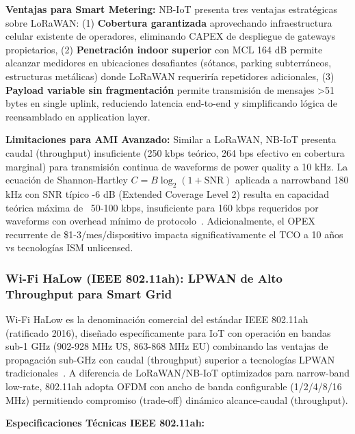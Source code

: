 \textbf{Ventajas para Smart Metering:} NB-IoT presenta tres ventajas estratégicas sobre LoRaWAN: (1) \textbf{Cobertura garantizada} aprovechando infraestructura celular existente de operadores, eliminando CAPEX de despliegue de gateways propietarios, (2) \textbf{Penetración indoor superior} con MCL 164 dB permite alcanzar medidores en ubicaciones desafiantes (sótanos, parking subterráneos, estructuras metálicas) donde LoRaWAN requeriría repetidores adicionales, (3) \textbf{Payload variable sin fragmentación} permite transmisión de mensajes >51 bytes en single uplink, reduciendo latencia end-to-end y simplificando lógica de reensamblado en application layer.

\textbf{Limitaciones para AMI Avanzado:} Similar a LoRaWAN, NB-IoT presenta caudal (throughput) insuficiente (250 kbps teórico, 264 bps efectivo en cobertura marginal) para transmisión continua de waveforms de power quality a 10 kHz. La ecuación de Shannon-Hartley $C = B \log_2(1 + \text{SNR})$ aplicada a narrowband 180 kHz con SNR típico -6 dB (Extended Coverage Level 2) resulta en capacidad teórica máxima de ~50-100 kbps, insuficiente para 160 kbps requeridos por waveforms con overhead mínimo de protocolo~\cite{chaudhariLPWANTechnologiesEmerging2020}. Adicionalmente, el OPEX recurrente de \$1-3/mes/dispositivo impacta significativamente el TCO a 10 años vs tecnologías ISM unlicensed.

\subsubsection{Wi-Fi HaLow (IEEE 802.11ah): LPWAN de Alto Throughput para Smart Grid}

Wi-Fi HaLow es la denominación comercial del estándar IEEE 802.11ah (ratificado 2016), diseñado específicamente para IoT con operación en bandas sub-1 GHz (902-928 MHz US, 863-868 MHz EU) combinando las ventajas de propagación sub-GHz con caudal (throughput) superior a tecnologías LPWAN tradicionales~\cite{zhengPerformancePowerConsumption2018,IEEE802.11ah-2016,austIEEE80211ahSubOnegigahertz2012}. A diferencia de LoRaWAN/NB-IoT optimizados para narrow-band low-rate, 802.11ah adopta OFDM con ancho de banda configurable (1/2/4/8/16 MHz) permitiendo compromiso (trade-off) dinámico alcance-caudal (throughput).

\textbf{Especificaciones Técnicas IEEE 802.11ah:}

